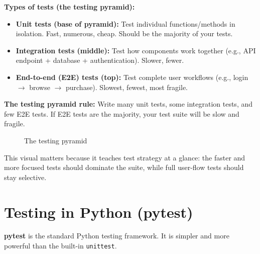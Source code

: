 \documentclass[12pt, a4paper, oneside]{book}
\begin{document}
\textbf{Types of tests (the testing pyramid):}
\begin{itemize}[leftmargin=2em]
    \item \textbf{Unit tests (base of pyramid):} Test individual functions/methods in isolation. Fast, numerous, cheap. Should be the majority of your tests.
    \item \textbf{Integration tests (middle):} Test how components work together (e.g., API endpoint + database + authentication). Slower, fewer.
    \item \textbf{End-to-end (E2E) tests (top):} Test complete user workflows (e.g., login $\to$ browse $\to$ purchase). Slowest, fewest, most fragile.
\end{itemize}

\begin{notebox}
\textbf{The testing pyramid rule:} Write many unit tests, some integration tests, and few E2E tests. If E2E tests are the majority, your test suite will be slow and fragile.
\end{notebox}

\begin{figure}[H]
\centering
{}
\caption{The testing pyramid}
\label{fig:testing-pyramid}
\end{figure}

This visual matters because it teaches test strategy at a glance: the faster and more focused tests should dominate the suite, while full user-flow tests should stay selective.

\section{Testing in Python (pytest)}

\textbf{pytest} is the standard Python testing framework. It is simpler and more powerful than the built-in \texttt{unittest}.
\end{document}
